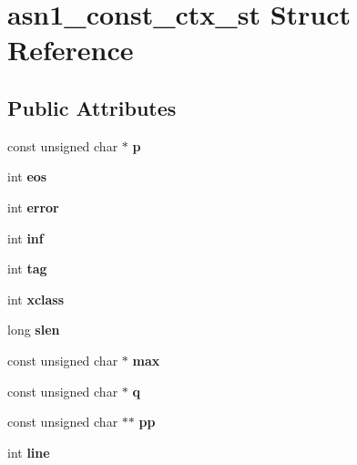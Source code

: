 \hypertarget{structasn1__const__ctx__st}{}\section{asn1\+\_\+const\+\_\+ctx\+\_\+st Struct Reference}
\label{structasn1__const__ctx__st}
\subsection*{Public Attributes}
\begin{DoxyCompactItemize}
\item 
\mbox{\label{structasn1__const__ctx__st_a7b1479e0de9e547ae50c83fa4ffbed07}} 
const unsigned char $\ast$ {\bfseries p}
\item 
\mbox{\label{structasn1__const__ctx__st_a649ad5c068ec65b6d8cee56b95619fc9}} 
int {\bfseries eos}
\item 
\mbox{\label{structasn1__const__ctx__st_aa281e6701fb7934c2cca8c7a686372f8}} 
int {\bfseries error}
\item 
\mbox{\label{structasn1__const__ctx__st_a29867a3ac1efeae0c85e6de7989ce000}} 
int {\bfseries inf}
\item 
\mbox{\label{structasn1__const__ctx__st_afecdc50f4ad882589b5003b96e60a7ef}} 
int {\bfseries tag}
\item 
\mbox{\label{structasn1__const__ctx__st_ae7e37b4b1a3f13d4b220f7ddf084b662}} 
int {\bfseries xclass}
\item 
\mbox{\label{structasn1__const__ctx__st_ae0e8c4c5c13f58bf7ecb108b7c5b5e71}} 
long {\bfseries slen}
\item 
\mbox{\label{structasn1__const__ctx__st_a800940377825d8d1aa2a2040ce78d908}} 
const unsigned char $\ast$ {\bfseries max}
\item 
\mbox{\label{structasn1__const__ctx__st_a114e72fe35806cdb7846e39440450c76}} 
const unsigned char $\ast$ {\bfseries q}
\item 
\mbox{\label{structasn1__const__ctx__st_a576eca9e431bff6f31af32d0973ec700}} 
const unsigned char $\ast$$\ast$ {\bfseries pp}
\item 
\mbox{\label{structasn1__const__ctx__st_acd270a3b54b4ec360447b76a44410943}} 
int {\bfseries line}
\end{DoxyCompactItemize}


